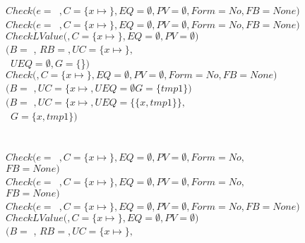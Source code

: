 \begin{small}
\begin{tabbing}
\>\>$Check(e=$~$, C=\{x \mapsto$$\},
         EQ=\emptyset,PV=\emptyset, Form = No, FB = None)$\\
\>\>\>$Check(e=$~$, C=\{x \mapsto$$\},
          EQ=\emptyset,PV=\emptyset, Form = No, FB = None)$\\
\>\>\>\>$CheckLValue($$, C = \{x \mapsto$$\}, EQ = \emptyset, PV = \emptyset)$ \\
\>\>\>\>\>$(B = $ , $RB = $$,
                     \mathit{UC} = \{x \mapsto$$\},$\\
\>\>\>\>\>~$UEQ = \emptyset, G = \{$\}$)$ \\
\>\>\>$Check($$,C  =\{x\mapsto$$\}, EQ = \emptyset, PV = \emptyset,
                       Form = No, FB = None)$\\
\>\>\>\>$(B = $ $, \mathit{UC} = \{x\mapsto$$,
                UEQ = \emptyset G = \{tmp1\})$\\
\>\>\>$(B = $ $, \mathit{UC} = \{x\mapsto$$ ,
             UEQ = \{\{x, tmp1\}\},$\\
\>\>\>~$G = \{x, tmp1\})$\\ \\
\>\\
\>\>$Check(e=$~$, C=\{x \mapsto$$\},
         EQ=\emptyset,PV=\emptyset, Form = No,$\\
\>\>\>\>\>$FB = None)$\\
\>\>\>$Check(e=$~$, C=\{x \mapsto$$\},
          EQ=\emptyset,PV=\emptyset, Form = No,$\\
\>\>\>\>\>\>$FB = None)$\\
\>\>\>\>$Check(e=$~$, C=\{x \mapsto$$\},
          EQ=\emptyset,PV=\emptyset, Form = No, FB = None)$\\
\>\>\>\>\>$CheckLValue($$, C = \{x \mapsto$$\}, EQ =  \emptyset,
                   PV = \emptyset)$ \\
\>\>\>\>\>\>$(B = $ , $RB = $$,
                     \mathit{UC} = \{x \mapsto$$\},$\\

\end{tabbing}
\end{small}
